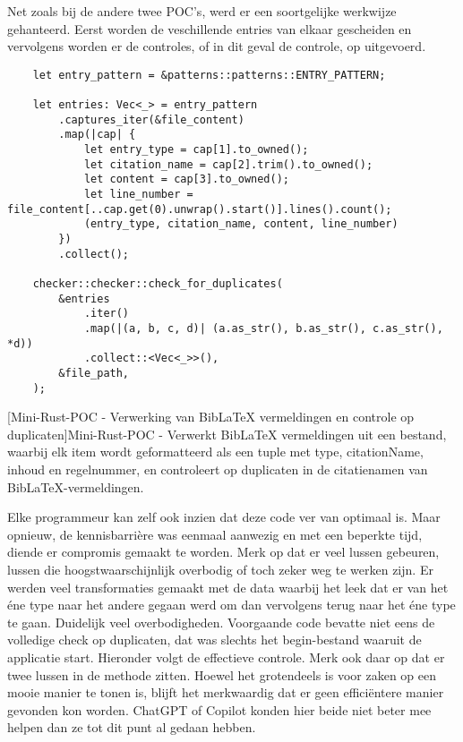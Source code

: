 Net zoals bij de andere twee \acrshort{POC}'s, werd er een soortgelijke werkwijze gehanteerd. Eerst worden de veschillende entries van elkaar gescheiden en vervolgens worden er de controles, of in dit geval de controle, op uitgevoerd.
\begin{verbatim}
    let entry_pattern = &patterns::patterns::ENTRY_PATTERN;

    let entries: Vec<_> = entry_pattern
        .captures_iter(&file_content)
        .map(|cap| {
            let entry_type = cap[1].to_owned();
            let citation_name = cap[2].trim().to_owned();
            let content = cap[3].to_owned();
            let line_number = file_content[..cap.get(0).unwrap().start()].lines().count();
            (entry_type, citation_name, content, line_number)
        })
        .collect();

    checker::checker::check_for_duplicates(
        &entries
            .iter()
            .map(|(a, b, c, d)| (a.as_str(), b.as_str(), c.as_str(), *d))
            .collect::<Vec<_>>(),
        &file_path,
    );
\end{verbatim}
[Mini-Rust-\acrshort{POC} - Verwerking van BibLaTeX vermeldingen en controle op duplicaten]{Mini-Rust-\acrshort{POC} - Verwerkt BibLaTeX vermeldingen uit een bestand, waarbij elk item wordt geformatteerd als een tuple met type, citationName, inhoud en regelnummer, en controleert op duplicaten in de citatienamen van BibLaTeX-vermeldingen. \label{lst:mini_rust_poc_entry_processing}}

Elke programmeur kan zelf ook inzien dat deze code ver van optimaal is. Maar opnieuw, de kennisbarrière was eenmaal aanwezig en met een beperkte tijd, diende er compromis gemaakt te worden. Merk op dat er veel lussen gebeuren, lussen die hoogstwaarschijnlijk overbodig of toch zeker weg te werken zijn. Er werden veel transformaties gemaakt met de data waarbij het leek dat er van het éne type naar het andere gegaan werd om dan vervolgens terug naar het éne type te gaan. Duidelijk veel overbodigheden. Voorgaande code bevatte niet eens de volledige check op duplicaten, dat was slechts het begin-bestand waaruit de applicatie start. Hieronder volgt de effectieve controle. Merk ook daar op dat er twee lussen in de methode zitten. Hoewel het grotendeels is voor zaken op een mooie manier te tonen is, blijft het merkwaardig dat er geen efficiëntere manier gevonden kon worden. ChatGPT of Copilot konden hier beide niet beter mee helpen dan ze tot dit punt al gedaan hebben.

